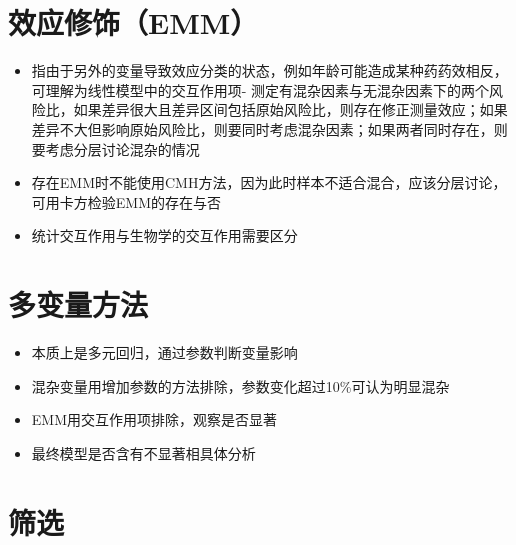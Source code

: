 \documentclass[
]{book}
\providecommand{\tightlist}{%
  \setlength{\itemsep}{0pt}\setlength{\parskip}{0pt}}
\begin{document}
\hypertarget{ux6548ux5e94ux4feeux9970emm}{%
\section{效应修饰（EMM）}\label{ux6548ux5e94ux4feeux9970emm}}

\begin{itemize}
\tightlist
\item
  指由于另外的变量导致效应分类的状态，例如年龄可能造成某种药药效相反，可理解为线性模型中的交互作用项- 测定有混杂因素与无混杂因素下的两个风险比，如果差异很大且差异区间包括原始风险比，则存在修正测量效应；如果差异不大但影响原始风险比，则要同时考虑混杂因素；如果两者同时存在，则要考虑分层讨论混杂的情况
\item
  存在EMM时不能使用CMH方法，因为此时样本不适合混合，应该分层讨论，可用卡方检验EMM的存在与否
\item
  统计交互作用与生物学的交互作用需要区分
\end{itemize}

\hypertarget{ux591aux53d8ux91cfux65b9ux6cd5}{%
\section{多变量方法}\label{ux591aux53d8ux91cfux65b9ux6cd5}}

\begin{itemize}
\tightlist
\item
  本质上是多元回归，通过参数判断变量影响
\item
  混杂变量用增加参数的方法排除，参数变化超过10\%可认为明显混杂
\item
  EMM用交互作用项排除，观察是否显著
\item
  最终模型是否含有不显著相具体分析
\end{itemize}

\hypertarget{ux7b5bux9009}{%
\section{筛选}\label{ux7b5bux9009}}
\end{document}
